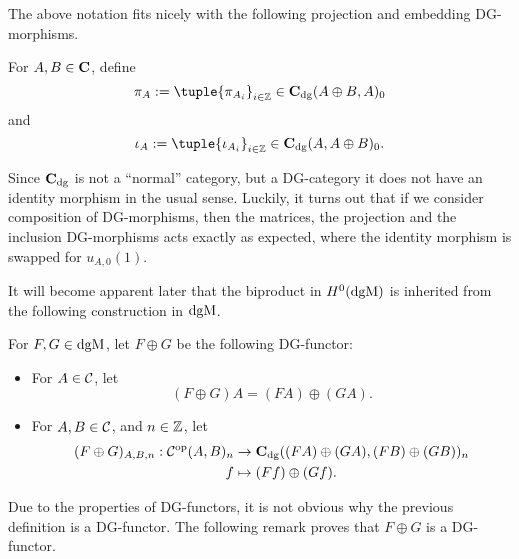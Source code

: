 The above notation fits nicely with the following projection and embedding DG-morphisms.
\begin{definition}
    For \( A, B \in \operatorname{\mathbf{C}} \), define
    \[
        \pi_A := \tuple{\pi_{A_i}}_{i \in \Zb} \in \C_{\dg}(A \oplus B, A)_0
    \]
    and
    \[
        \iota_A := \tuple{\iota_{A_i}}_{i \in \Zb} \in \C_{\dg}(A, A \oplus B)_0.
    \]
\end{definition}

Since \( \operatorname{\mathbf{C}}_{\operatorname{dg}} \) is not a ``normal'' category, but a DG-category it does not have an identity morphism in the usual sense. Luckily, it turns out that if we consider composition of DG-morphisms, then the matrices, the projection and the inclusion DG-morphisms acts exactly as expected, where the identity morphism is swapped for \( u_{A, 0}(1) \).

It will become apparent later that the biproduct in \( H^0(\operatorname{dgM}) \) is inherited from the following construction in \( \operatorname{dgM} \).

\begin{definition}
    \label{def:dgm_biproduct}
    For \( F, G \in \operatorname{dgM} \), let \( F \oplus G \) be the following DG-functor:
    \begin{itemize}
        \item {
            For \( A \in {\mathcal{C}} \), let
            \[
                (F \oplus G) A = (F A) \oplus (G A).
            \]
        }
        \item {
            For \( A, B \in {\mathcal{C}} \), and \( n \in {\mathbb{Z}} \), let
            \begin{align*}
                (F \oplus G)_{A, B, n}: {\mathcal{C}}^{\operatorname{op}}(A, B)_n &\to \operatorname{\mathbf{C}}_{\operatorname{dg}}((F A) \oplus (G A), (F B) \oplus (G B))_n \\
                f &\mapsto (F f) \oplus (G f).
            \end{align*}
        }
    \end{itemize}
\end{definition}

Due to the properties of DG-functors, it is not obvious why the previous definition is a DG-functor. The following remark proves that \( F \oplus G \) is a DG-functor.

